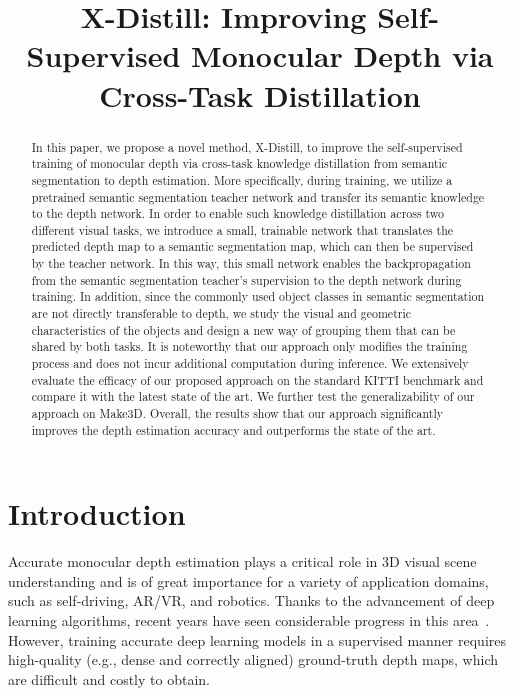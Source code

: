 \documentclass{bmvc2k}
\title{X-Distill: Improving Self-Supervised Monocular Depth via Cross-Task Distillation}
\begin{document}
\maketitle

\vspace{-10pt}
\begin{abstract}
In this paper, we propose a novel method, X-Distill, to improve the self-supervised training of monocular depth via cross-task knowledge distillation from semantic segmentation to depth estimation. More specifically, during training, we utilize a pretrained semantic segmentation teacher network and transfer its semantic knowledge to the depth network. In order to enable such knowledge distillation across two different visual tasks, we introduce a small, trainable network that translates the predicted depth map to a semantic segmentation map, which can then be supervised by the teacher network. In this way, this small network enables the backpropagation from the semantic segmentation teacher's supervision to the depth network during training. In addition, since the commonly used object classes in semantic segmentation are not directly transferable to depth, we study the visual and geometric characteristics of the objects and design a new way of grouping them that can be shared by both tasks. It is noteworthy that our approach only modifies the training process and does not incur additional computation during inference. We extensively evaluate the efficacy of our proposed approach on the standard KITTI benchmark and compare it with the latest state of the art. We further test the generalizability of our approach on Make3D. Overall, the results show that our approach significantly improves the depth estimation accuracy and outperforms the state of the art. 
\end{abstract}

\vspace{-15pt}
\section{Introduction}\label{sec:intro}
\vspace{-8pt}
Accurate monocular depth estimation plays a critical role in 3D visual scene understanding and is of great importance for a variety of application domains, such as self-driving, AR/VR, and robotics. Thanks to the advancement of deep learning algorithms, recent years have seen considerable progress in this area~\cite{ming2021deep}. However, training accurate deep learning models in a supervised manner requires high-quality (e.g., dense and correctly aligned) ground-truth depth maps, which are difficult and costly to obtain.
\end{document}
